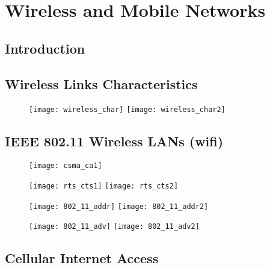 \section{Wireless and Mobile Networks}


\subsection{Introduction}


\subsection{Wireless Links Characteristics}

\begin{figure}[H]
  \centering
  \texttt{[image: wireless\_char]}
  \texttt{[image: wireless\_char2]}
\end{figure}

\subsection{IEEE 802.11 Wireless LANs (wifi)}

\begin{figure}[H]
  \centering
  \texttt{[image: csma\_ca1]}
\end{figure}

\begin{figure}[H]
  \centering
  \texttt{[image: rts\_cts1]}
  \texttt{[image: rts\_cts2]}
\end{figure}

\begin{figure}[H]
  \centering
  \texttt{[image: 802\_11\_addr]}
  \texttt{[image: 802\_11\_addr2]}
\end{figure}

\begin{figure}[H]
  \centering
  \texttt{[image: 802\_11\_adv]}
  \texttt{[image: 802\_11\_adv2]}
\end{figure}

\subsection{Cellular Internet Access}

